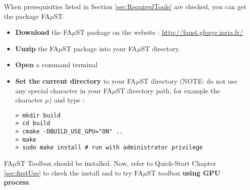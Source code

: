 When prerequisities listed in Section \ref{sec:RequiredTools} are checked, you can get the package FA$\mu$ST.
\begin{itemize}
\item \textbf{Download} the FA$\mu$ST package on the website :  \url{http://faust.gforge.inria.fr/}
\item \textbf{Unzip} the FA$\mu$ST package into your FA$\mu$ST directory.
\item \textbf{Open} a command terminal
\item \textbf{Set the current directory} to your FA$\mu$ST directory (NOTE: do not use any special character in your FA$\mu$ST directory path, for example the character $\mu$) and type :

\lstset{style=customBash}
\begin{lstlisting}
> mkdir build
> cd build
> cmake -DBUILD_USE_GPU="ON" ..
> make
> sudo make install # run with administrator privilege
\end{lstlisting}

\end{itemize}


FA$\mu$ST Toolbox should be installed. Now, refer to Quick-Start Chapter \ref{sec:firstUse} to check the install and to try FA$\mu$ST toolbox \textbf{using GPU process}.

